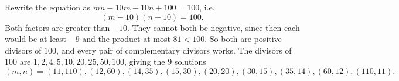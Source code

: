 Rewrite the equation as $mn-10m-10n+100=100$, i.e.
\[(m-10)(n-10)=100.\]
Both factors are greater than $-10$. They cannot both be negative, since then each would be at least $-9$ and the product at most $81<100$. So both are positive divisors of $100$, and every pair of complementary divisors works. The divisors of $100$ are $1,2,4,5,10,20,25,50,100$, giving the $9$ solutions
\[\boxed{(m,n)=(11,110),(12,60),(14,35),(15,30),(20,20),(30,15),(35,14),(60,12),(110,11).}\]
